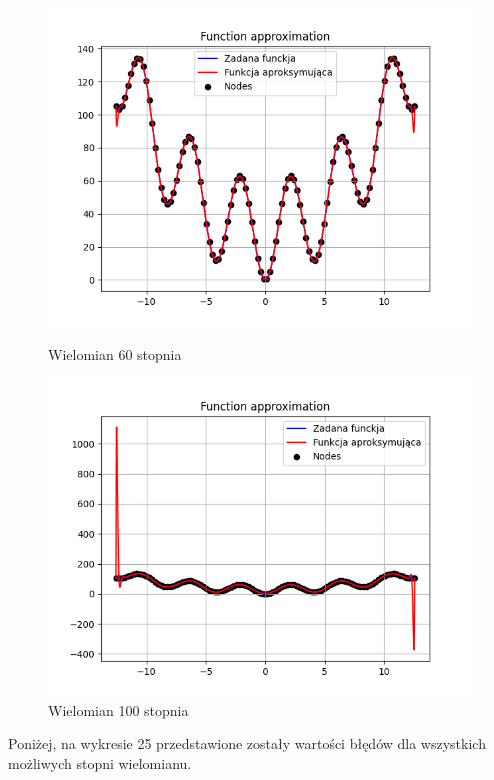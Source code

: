 \documentclass{article}
\begin{document}
\begin{figure}[H]
\begin{minipage}[b]{0.49\textwidth}
    \begin{minipage}[b]{\textwidth}
      \includegraphics[width=\textwidth]{img25.png}
      \caption{Wielomian 60 stopnia}
    \end{minipage}
    \vspace*{\fill}
    \begin{minipage}[b]{\textwidth}
      \includegraphics[width=\textwidth]{img26.png}
      \caption{Wielomian 100 stopnia}
    \end{minipage}
  \end{minipage}
\end{figure}

Poniżej, na wykresie 25 przedstawione zostały wartości błędów dla wszystkich możliwych stopni wielomianu.
\end{document}
